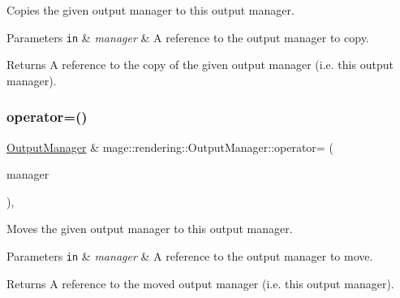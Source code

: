 Copies the given output manager to this output manager.


\begin{DoxyParams}[1]{Parameters}
\mbox{\tt in}  & {\em manager} & A reference to the output manager to copy. \\
\hline
\end{DoxyParams}
\begin{DoxyReturn}{Returns}
A reference to the copy of the given output manager (i.\+e. this output manager). 
\end{DoxyReturn}
\hypertarget{classmage_1_1rendering_1_1_output_manager_a97d2c2be4389a615eb084dd53af531aa}{}\label{classmage_1_1rendering_1_1_output_manager_a97d2c2be4389a615eb084dd53af531aa} 
\subsubsection{\texorpdfstring{operator=()}{operator=()}\hspace{0.1cm}{\footnotesize\ttfamily [2/2]}}
{\footnotesize\ttfamily \hyperlink{classmage_1_1rendering_1_1_output_manager}{Output\+Manager} \& mage\+::rendering\+::\+Output\+Manager\+::operator= (\begin{DoxyParamCaption}\item[{\hyperlink{classmage_1_1rendering_1_1_output_manager}{Output\+Manager} \&\&}]{manager }\end{DoxyParamCaption})\hspace{0.3cm}{\ttfamily [default]}, {\ttfamily [noexcept]}}

Moves the given output manager to this output manager.


\begin{DoxyParams}[1]{Parameters}
\mbox{\tt in}  & {\em manager} & A reference to the output manager to move. \\
\hline
\end{DoxyParams}
\begin{DoxyReturn}{Returns}
A reference to the moved output manager (i.\+e. this output manager). 
\end{DoxyReturn}
\hypertarget{classmage_1_1rendering_1_1_output_manager_a997a7c48090b5b68e643f3158e9e9d7e}{}\label{classmage_1_1rendering_1_1_output_manager_a997a7c48090b5b68e643f3158e9e9d7e} 
